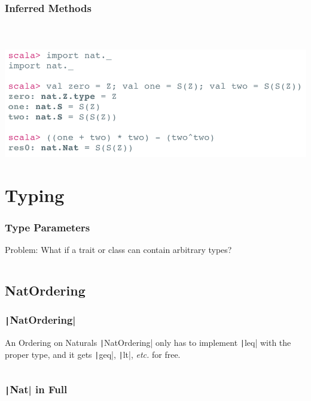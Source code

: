 \documentclass[10pt, usenames, dvipsnames, table]{beamer}
\begin{document}
\begin{frame}
  \frametitle{Inferred Methods}
  \inputminted[firstline=1, lastline=1, fontsize=\tiny]
  {Scala}{../examples/Nat.scala}
  \inputminted[firstline=5, lastline=12, fontsize=\tiny]
  {Scala}{../examples/Nat.scala}
  \inputminted[firstline=19, lastline=19, fontsize=\tiny]
  {Scala}{../examples/Nat.scala}
  \pause{}
  \includegraphics[width=0.7\linewidth]{nat_usage}
\end{frame}

\section{Typing}

\begin{frame}
  \frametitle{Type Parameters}
  \begin{block}{Problem:}
    What if a trait or class can contain arbitrary types?
  \end{block}
  \vspace{1em}
  \pause{}
  \inputminted[fontsize=\small]{Scala}{../examples/Ord.scala}
\end{frame}

\subsection{NatOrdering}
\begin{frame}
  \frametitle{\texttt|NatOrdering|}
  \begin{block}{An Ordering on Naturals}
    \texttt|NatOrdering| only has to implement
    \texttt|leq| with the proper type, and it gets
    \texttt|geq|, \texttt|lt|, \emph{etc.} for free.
  \end{block}

  \inputminted[firstline=21, lastline=28]
  {Scala}{../examples/Nat.scala}
\end{frame}

\begin{frame}
  \frametitle{\texttt|Nat| in Full}
  \inputminted[firstline=5, lastline=28, fontsize=\tiny]
  {Scala}{../examples/Nat.scala}
  \vspace{-0.25\linewidth}
\end{frame}
\end{document}
